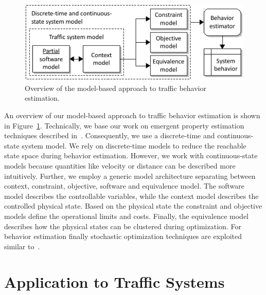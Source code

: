 \documentclass[conference]{../cls/IEEEtran}
\begin{document}
\begin{figure}[b]
	\centering
	\includegraphics{../gfx/framework.pdf}
	\caption{Overview of the model-based approach to traffic behavior estimation.}
	\label{fig:framework}
\end{figure}
An overview of our model-based approach to traffic behavior estimation is shown in Figure~\ref{fig:framework}. Technically, we base our work on emergent property estimation techniques described in~\cite{Hackenberg2012}. Consequently, we use a discrete-time and continuous-state system model. We rely on discrete-time models to reduce the reachable state space during behavior estimation. However, we work with continuous-state models because quantities like velocity or distance can be described more intuitively. Further, we employ a generic model architecture separating between context, constraint, objective, software and equivalence model. The software model describes the controllable variables, while the context model describes the controlled physical state. Based on the physical state the constraint and objective models define the operational limits and costs. Finally, the equivalence model describes how the physical states can be clustered during optimization. For behavior estimation finally stochastic optimization techniques are exploited similar to~\cite{Pereira1991}.

\section{Application to Traffic Systems}
\end{document}
